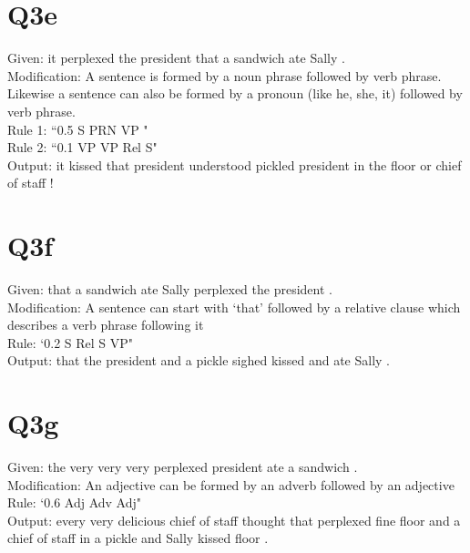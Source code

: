 \documentclass[12pt]{article}
\begin{document}
\section*{Q3e}
Given: it perplexed the president that a sandwich ate Sally .\\
Modification: A sentence is formed by a noun phrase followed by verb phrase. Likewise a sentence can also be formed by a pronoun (like he, she, it) followed by verb phrase.\\
Rule 1: ``0.5\hspace{1cm}	S \hspace{1cm}	PRN VP "\\
Rule 2: ``0.1\hspace{1cm}	VP\hspace{1cm}	VP Rel S"\\
Output: it  kissed  that  president  understood  pickled  president  in  the  floor  or  chief  of  staff  ! \\
\pagebreak
\section*{Q3f}
Given: that a sandwich ate Sally perplexed the president .\\
Modification: A sentence can start with ‘that’ followed by a relative clause which describes a verb phrase following it\\
Rule: `0.2\hspace{1cm}	S\hspace{1cm} Rel S VP"\\
Output: that the president and a pickle sighed kissed and ate Sally . \\
\pagebreak
\section*{Q3g}
Given: the very very very perplexed president ate a sandwich .\\
Modification: An adjective can be formed by an adverb followed by an adjective\\
Rule: `0.6\hspace{1cm}	Adj\hspace{1cm}	Adv Adj"\\
Output: every very delicious chief of staff thought that perplexed fine floor and a chief of staff in a pickle and Sally kissed floor .\\
\pagebreak
\end{document}
